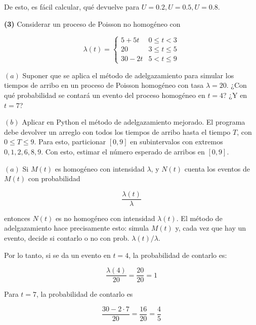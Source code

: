 \documentclass[a4paper, 12pt]{article}
\begin{document}
De esto, es fácil calcular, qué devuelve para $U = 0.2, U = 0.5, U = 0.8$. 

\pagebreak 

\begin{myframe}
  \textbf{(3)} Considerar un proceso de Poisson no homogéneo con 

  \begin{equation*}
    \lambda(t) = \begin{cases}
      5 + 5t & 0 \leq t < 3 \\ 
      20 &  3 \leq t \leq 5 \\ 
      30 - 2t & 5 < t \leq 9
    \end{cases}
  \end{equation*}

  $(a)$ Suponer que se aplica el método de adelgazamiento para simular los
  tiempos de arribo en un proceso de Poisson homogéneo con tasa $\lambda = 20$.
  ¿Con qué probabilidad se contará un evento del proceso homogéneo en $t =4$?
  ¿Y en $t = 7$? 

  $(b)$ Aplicar en Python el método de adelgazamiento mejorado. El programa debe
  devolver un arreglo con todos los tiempos de arribo hasta el tiempo $T$, con
  $0 \leq T \leq 9$. Para esto, particionar $[0, 9]$ en subintervalos con
  extremos $0, 1, 2, 6, 8, 9$. Con esto, estimar el número esperado de arribos
  en $[0, 9]$.
\end{myframe}

$(a)$ Si $M(t)$ es homogéneo con intensidad $\lambda$, y $N(t)$ cuenta los
eventos de $M(t)$ con probabilidad 

\begin{equation*}
  \frac{\lambda(t)}{\lambda}
\end{equation*}

entonces $N(t)$ es no homogéneo con intensidad $\lambda(t)$. El método de
adelgazamiento hace precisamente esto: simula $M(t)$ y, cada vez que hay un
evento, decide si contarlo o no con prob. $\lambda(t) / \lambda$.

Por lo  tanto, si se da un evento en $t = 4$, la probabilidad de contarlo es:

\begin{equation*}
  \frac{\lambda(4)}{20} = \frac{20}{20} = 1
\end{equation*}

Para $t = 7$, la probabilidad de contarlo es 

\begin{equation*}
  \frac{30 - 2\cdot 7}{20} = \frac{16}{20} = \frac{4}{5}
\end{equation*}
\end{document}
